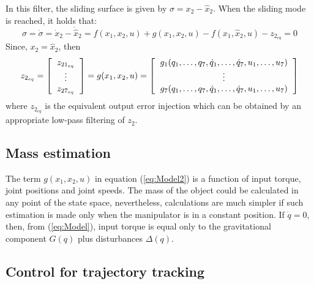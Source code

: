 \documentclass[a4paper, 10pt]{article}
\begin{document}
In this filter, the sliding surface is given by $\sigma = x_2 - \hat{x}_2$. When the sliding mode is reached, it holds that:
\[\sigma = \dot{\sigma} = \dot{x}_2 - \dot{\hat{x}}_2 = f(x_1, x_2, u) + g(x_1, x_2, u) - f(x_1, \hat{x}_2, u) - z_{2_{eq}} = 0\]
Since,  $x_2 = \hat{x}_2$, then
\begin{equation*}
  z_{2_{eq}} = \left[\begin{tabular}{c}
      $z_{21_{eq}}$\\
      $\vdots$\\
      $z_{27_{eq}}$
    \end{tabular}\right] = g(x_1, x_2, u) =
  \left[\begin{tabular}{c}
      $g_1(q_1,\dots, q_7, \dot{q}_1, \dots, \dot{q}_7, u_1, \dots,u_7)$\\
      $\vdots$\\
      $g_7(q_1,\dots, q_7, \dot{q}_1, \dots, \dot{q}_7, u_1, \dots,u_7)$
    \end{tabular}\right] 
\end{equation*}
where $z_{2_{eq}}$ is the equivalent output error injection which can be obtained by an appropriate low-pass filtering of $z_2$. 

\subsection{Mass estimation}
The term $g(x_1, x_2, u)$ in equation (\ref{eq:Model2}) is a function of input torque, joint positions and joint speeds. The mass of the object could be calculated in any point of the state space, nevertheless, calculations are much simpler if such estimation is made only when the manipulator is in a constant position. If $\dot{q}=0$, then, from (\ref{eq:Model}), input torque is equal only to the gravitational component $G(q)$ plus disturbances $\Delta (q)$.

\subsection{Control for trajectory tracking}
\end{document}
